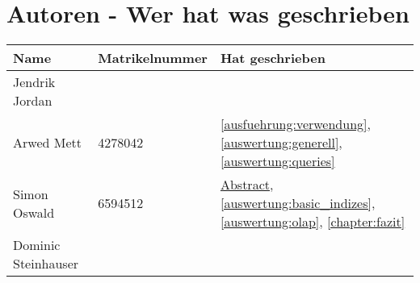 \chapter{Autoren - Wer hat was geschrieben}
\begin{table}[H]
	\centering
	\begin{tabularx}{\textwidth}{llX}
		\toprule
		Name                &	Matrikelnummer  & Hat geschrieben \\
		\toprule
		Jendrik Jordan      &                   & \\
		Arwed Mett          &   4278042         & \autoref{ausfuehrung:verwendung}, \autoref{auswertung:generell}, \autoref{auswertung:queries} \\
		Simon Oswald        &   6594512         & \hyperref[abstract]{Abstract}, \autoref{auswertung:basic_indizes}, \autoref{auswertung:olap}, \autoref{chapter:fazit} \\
		Dominic Steinhauser &                   & \\
		\bottomrule
	\end{tabularx}
	\label{tab:autoren}
\end{table}
